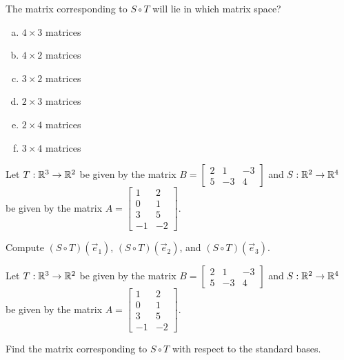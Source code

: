 \begin{applicationActivities}{1}{21}
\begin{activity}{3}
The matrix corresponding to $S \circ T$ will lie in which matrix space?
\begin{enumerate}[(a)]
\item $4 \times 3$ matrices
\item $4 \times 2$ matrices
\item $3 \times 2$ matrices
\item $2 \times 3$ matrices
\item $2 \times 4$ matrices
\item $3 \times 4$ matrices
\end{enumerate}
\end{activity}

\begin{activity}{9}
Let $T: \mathbb{R}^3 \rightarrow \mathbb{R}^2$ be given by the matrix $B=\begin{bmatrix} 2 & 1 & -3 \\ 5 & -3 & 4 \end{bmatrix}$ and $S: \mathbb{R}^2 \rightarrow \mathbb{R}^4$ be given by the matrix $A=\begin{bmatrix} 1 & 2 \\ 0 & 1 \\ 3 & 5 \\ -1 & -2 \end{bmatrix}$.

Compute $(S \circ T)(\vec{e}_1)$, $(S \circ T)(\vec{e}_2)$, and
$(S \circ T)(\vec{e}_3)$.
\end{activity}

\begin{activity}{5}
Let $T: \mathbb{R}^3 \rightarrow \mathbb{R}^2$ be given by the matrix $B=\begin{bmatrix} 2 & 1 & -3 \\ 5 & -3 & 4 \end{bmatrix}$ and $S: \mathbb{R}^2 \rightarrow \mathbb{R}^4$ be given by the matrix $A=\begin{bmatrix} 1 & 2 \\ 0 & 1 \\ 3 & 5 \\ -1 & -2 \end{bmatrix}$.

Find the matrix corresponding to $S \circ T$ with respect to the standard bases.
\end{activity}


\end{applicationActivities}
